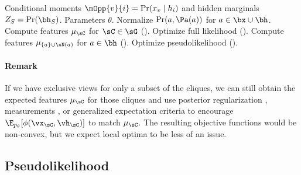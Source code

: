 \begin{algorithm}
  \caption{\LearnParameters}
  \label{algo:undirected}
  \begin{algorithmic}
    \REQUIRE Conditional moments $\mOpp{v}{i} = \Pr(x_v \mid h_i)$
             and hidden marginals $Z_S = \Pr(\bh_S)$.
    \ENSURE Parameters $\theta$.
     \STATE Normalize $\Pr(a,\Pa(a))$ for $a \in \bx \cup \bh$.
      \STATE Compute features $\mu_\sC$ for $\sC \in \sG$ ().
      \STATE Optimize full likelihood ().
      \STATE Compute features $\mu_{\{a\} \cup \sN(a)}$ for $a \in \bh$ ().
      \STATE Optimize pseudolikelihood ().
    \ENDIF
    \end{algorithmic}
\end{algorithm}

\paragraph{Remark} If we have exclusive views for only a subset of the cliques,
we can still obtain the expected features $\mu_\sC$ for those cliques
  and use posterior regularization \citep{graca08em}, measurements \citep{liang09measurements}, or generalized
  expectation criteria \citep{mann08ge}
  to encourage $\E_{p_\theta}[\phi(\vx_\sC,\vh_\sC)]$ to match $\mu_\sC$.
The resulting objective functions would be non-convex, but we expect
  local optima to be less of an issue.

\subsection{Pseudolikelihood}
\label{sec:pseudolikelihood}

